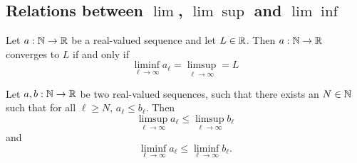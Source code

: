 \subsection{Relations between $\lim$, $\lim\sup$ and $\lim\inf$}
\begin{proposition}
    Let $a: \mathbb{N} \to \mathbb{R}$ be a real-valued sequence and let $L \in \mathbb{R}$. Then $a: \mathbb{N} \to \mathbb{R}$ converges to $L$ if and only if
    $$\liminf_{\ell\to\infty}a_\ell = \limsup_{\ell\to\infty} = L$$
\end{proposition}

\begin{proposition}
    Let $a,b: \mathbb{N} \to \mathbb{R}$ be two real-valued sequences, such that there exists an $N \in \mathbb{N}$ such that for all $\ell \ge N$,
    $a_\ell \le b_\ell.$ Then
    $$\limsup_{\ell\to\infty}a_\ell \le \limsup_{\ell\to\infty}b_\ell$$ and 
    $$\liminf_{\ell\to\infty}a_\ell \le \liminf_{\ell\to\infty}b_\ell.$$
\end{proposition}
